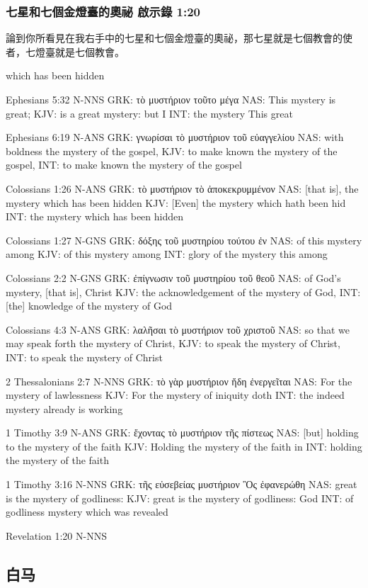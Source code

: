 \subsubsection{七星和七個金燈臺的奧祕 啟示錄 1:20}
論到你所看見在我右手中的七星和七個金燈臺的奧祕，那七星就是七個教會的使者，七燈臺就是七個教會。
 


  which has been hidden

Ephesians 5:32 N-NNS
GRK: τὸ μυστήριον τοῦτο μέγα
NAS: This mystery is great;
KJV: is a great mystery: but I
INT: the mystery This great

Ephesians 6:19 N-ANS
GRK: γνωρίσαι τὸ μυστήριον τοῦ εὐαγγελίου
NAS: with boldness the mystery of the gospel,
KJV: to make known the mystery of the gospel,
INT: to make known the mystery of the gospel

Colossians 1:26 N-ANS
GRK: τὸ μυστήριον τὸ ἀποκεκρυμμένον
NAS: [that is], the mystery which has been hidden
KJV: [Even] the mystery which hath been hid
INT: the mystery which has been hidden

Colossians 1:27 N-GNS
GRK: δόξης τοῦ μυστηρίου τούτου ἐν
NAS: of this mystery among
KJV: of this mystery among
INT: glory of the mystery this among

Colossians 2:2 N-GNS
GRK: ἐπίγνωσιν τοῦ μυστηρίου τοῦ θεοῦ
NAS: of God's mystery, [that is], Christ
KJV: the acknowledgement of the mystery of God,
INT: [the] knowledge of the mystery of God

Colossians 4:3 N-ANS
GRK: λαλῆσαι τὸ μυστήριον τοῦ χριστοῦ
NAS: so that we may speak forth the mystery of Christ,
KJV: to speak the mystery of Christ,
INT: to speak the mystery of Christ

2 Thessalonians 2:7 N-NNS
GRK: τὸ γὰρ μυστήριον ἤδη ἐνεργεῖται
NAS: For the mystery of lawlessness
KJV: For the mystery of iniquity doth
INT: the indeed mystery already is working

1 Timothy 3:9 N-ANS
GRK: ἔχοντας τὸ μυστήριον τῆς πίστεως
NAS: [but] holding to the mystery of the faith
KJV: Holding the mystery of the faith in
INT: holding the mystery of the faith

1 Timothy 3:16 N-NNS
GRK: τῆς εὐσεβείας μυστήριον Ὃς ἐφανερώθη
NAS: great is the mystery of godliness:
KJV: great is the mystery of godliness: God
INT: of godliness mystery which was revealed

Revelation 1:20 N-NNS 






\subsection{白马}
